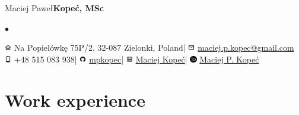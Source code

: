 \documentclass[11pt,a4paper]{article}
\makeatletter
\newcommand{\twhorline}[1]{\noindent\makebox[\linewidth]{\rule{\textwidth}{#1}}}
\newcommand{\firstname}{Maciej Paweł}
\newcommand{\familyname}{Kopeć}
\newcommand{\address}{Na Popielówkę 75P/2, 32-087 Zielonki, Poland}
\newcommand{\mobile}{+48 515 083 938}
\newcommand{\email}{\href{mailto:maciej.p.kopec@gmail.com}{maciej.p.kopec@gmail.com}}
\newcommand{\github}{\href{https://github.com/mpkopec}{mpkopec}}
\newcommand{\linkedin}{\href{https://www.linkedin.com/in/maciej-kope\%C4\%87-46735595/}{Maciej Kopeć}}
\newcommand{\orcid}{\href{https://orcid.org/0000-0002-1892-0417}{Maciej P. Kopeć}}
\makeatother
\begin{document}
	\begin{center}
		{\Huge \firstname \space \bfseries \familyname \normalfont, MSc}
		\vspace{1\baselineskip}

		\large
		\renewcommand*{\do}[1]{$\bullet$ #1 }
		$\bullet$
		\vspace{0.2\baselineskip}
		\twhorline{1pt}

		\vspace{0.25\baselineskip}
		\includegraphics[height=0.8em]{img/icons8-home-96.png}
		\address \space |
		\includegraphics[height=0.8em]{img/icons8-envelope-96.png}
		\email \\[.3em]

		\includegraphics[height=0.8em]{img/icons8-iphone-96.png}
		\mobile \space |
		\includegraphics[height=0.8em]{img/icons8-github-96.png}
		\github \space |
		\includegraphics[height=0.8em]{img/icons8-linkedin-96.png}
		\linkedin \space |
		\includegraphics[height=0.8em]{img/orcid-128.png}
		\orcid

		\twhorline{1pt}

	\end{center}

	\section{Work experience}
\end{document}
